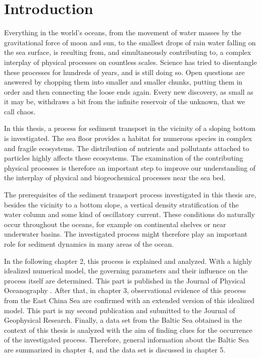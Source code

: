 \chapter{Introduction}
\label{kap-intro}



Everything in the world's oceans, from the movement of water masses 
by the gravitational force of moon and sun, to the smallest drops of rain water 
falling on the sea surface, is resulting from, and simultaneously contributing 
to, a complex interplay of physical processes on countless scales. Science has 
tried to disentangle these processes for hundreds of years, and is still doing 
so. Open questions are answered by chopping them into smaller and smaller 
chunks, putting them in order and then connecting the loose ends again. Every 
new discovery, as small as it may be, withdraws a bit from the infinite 
reservoir of the unknown, that we call chaos. 

In this thesis, a process for sediment transport in the vicinity of a 
sloping bottom is investigated. The sea floor provides a habitat for numerous 
species in complex and fragile ecosystems. The distribution of nutrients and 
pollutants attached to particles highly affects these ecosystems. The 
examination of the contributing physical processes is therefore an important 
step to improve our understanding of the interplay of physical and 
biogeochemical processes near the sea bed.

The prerequisites of the sediment transport process investigated in this thesis 
are, besides the vicinity to a bottom slope, a vertical density stratification 
of the water column and some kind of oscillatory current. These conditions do 
naturally occur throughout the oceans, for example on continental shelves or 
near underwater basins. The investigated process might therefore play an 
important role for sediment dynamics in many areas of the ocean.

In the following chapter 2, this process is explained and analyzed. With a 
highly idealized numerical model, the governing parameters and their 
influence on the process itself are determined. This part is published in 
the Journal of Physical Oceanography \citep[][]{schulzumlauf2016}. After that, 
in chapter 3, observational evidence of this process from the East China Sea 
are confirmed with an extended version of this idealized model. This part is my 
second publication and submitted to the Journal of Geophysical 
Research. Finally, a data set from the Baltic Sea obtained in the context of 
this thesis is analyzed with the aim of finding clues for the occurrence of the 
investigated process. Therefore, general information about the Baltic Sea are 
summarized in chapter 4, and the data set is discussed in chapter 5. 